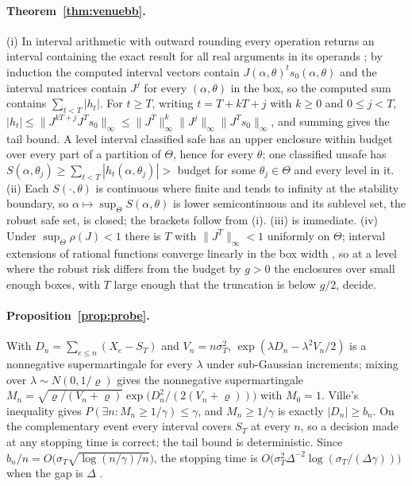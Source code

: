 \documentclass[12pt]{article}
\theoremstyle{definition}
\theoremstyle{remark}
\begin{document}
\paragraph{Theorem~\ref{thm:venuebb}.} (i) In interval arithmetic with outward rounding every operation returns an interval containing the exact result for all real arguments in its operands \citep{rump2010}; by induction the computed interval vectors contain $J(\alpha,\theta)^ts_0(\alpha,\theta)$ and the interval matrices contain $J^j$ for every $(\alpha,\theta)$ in the box, so the computed sum contains $\sum_{t<T}|h_t|$. For $t\ge T$, writing $t=T+kT+j$ with $k\ge0$ and $0\le j<T$, $|h_t|\le\|J^{kT+j}J^Ts_0\|_\infty\le\|J^T\|_\infty^k\|J^j\|_\infty\|J^Ts_0\|_\infty$, and summing gives the tail bound. A level interval classified safe has an upper enclosure within budget over every part of a partition of $\Theta$, hence for every $\theta$; one classified unsafe has $S(\alpha,\theta_j)\ge\sum_{t<T}|h_t(\alpha,\theta_j)|>$ budget for some $\theta_j\in\Theta$ and every level in it. (ii) Each $S(\cdot,\theta)$ is continuous where finite and tends to infinity at the stability boundary, so $\alpha\mapsto\sup_\Theta S(\alpha,\theta)$ is lower semicontinuous and its sublevel set, the robust safe set, is closed; the brackets follow from (i). (iii) is immediate. (iv) Under $\sup_\Theta\rho(J)<1$ there is $T$ with $\|J^T\|_\infty<1$ uniformly on $\Theta$; interval extensions of rational functions converge linearly in the box width \citep{hansen2004}, so at a level where the robust risk differs from the budget by $g>0$ the enclosures over small enough boxes, with $T$ large enough that the truncation is below $g/2$, decide.

\paragraph{Proposition~\ref{prop:probe}.} With $D_n=\sum_{e\le n}(X_e-S_T)$ and $V_n=n\sigma_T^2$, $\exp(\lambda D_n-\lambda^2V_n/2)$ is a nonnegative supermartingale for every $\lambda$ under sub-Gaussian increments; mixing over $\lambda\sim N(0,1/\varrho)$ gives the nonnegative supermartingale $M_n=\sqrt{\varrho/(V_n+\varrho)}\exp\bigl(D_n^2/(2(V_n+\varrho))\bigr)$ with $M_0=1$. Ville's inequality \citep{ville1939} gives $P(\exists n:M_n\ge1/\gamma)\le\gamma$, and $M_n\ge1/\gamma$ is exactly $|D_n|\ge b_n$. On the complementary event every interval covers $S_T$ at every $n$, so a decision made at any stopping time is correct; the tail bound is deterministic. Since $b_n/n=O\bigl(\sigma_T\sqrt{\log(n/\gamma)/n}\bigr)$, the stopping time is $O\bigl(\sigma_T^2\Delta^{-2}\log(\sigma_T/(\Delta\gamma))\bigr)$ when the gap is $\Delta$ \citep{howard2021}.
\end{document}
